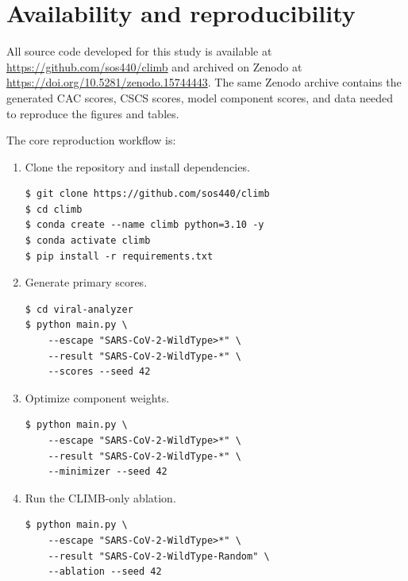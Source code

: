 \documentclass{article}
\numberwithin{theorem}{section}
\begin{document}
\section{Availability and reproducibility}

All source code developed for this study is available at
\url{https://github.com/sos440/climb} and archived on Zenodo at
\url{https://doi.org/10.5281/zenodo.15744443}. The same Zenodo archive contains
the generated CAC scores, CSCS scores, model component scores, and data needed to
reproduce the figures and tables.

The core reproduction workflow is:
\begin{enumerate}[leftmargin=*]
    \item Clone the repository and install dependencies.
\begin{verbatim}
$ git clone https://github.com/sos440/climb
$ cd climb
$ conda create --name climb python=3.10 -y
$ conda activate climb
$ pip install -r requirements.txt
\end{verbatim}
    \item Generate primary scores.
\begin{verbatim}
$ cd viral-analyzer
$ python main.py \
    --escape "SARS-CoV-2-WildType>*" \
    --result "SARS-CoV-2-WildType-*" \
    --scores --seed 42
\end{verbatim}
    \item Optimize component weights.
\begin{verbatim}
$ python main.py \
    --escape "SARS-CoV-2-WildType>*" \
    --result "SARS-CoV-2-WildType-*" \
    --minimizer --seed 42
\end{verbatim}
    \item Run the CLIMB-only ablation.
\begin{verbatim}
$ python main.py \
    --escape "SARS-CoV-2-WildType>*" \
    --result "SARS-CoV-2-WildType-Random" \
    --ablation --seed 42
\end{verbatim}
\end{enumerate}

\FloatBarrier
\printbibliography
\end{document}
